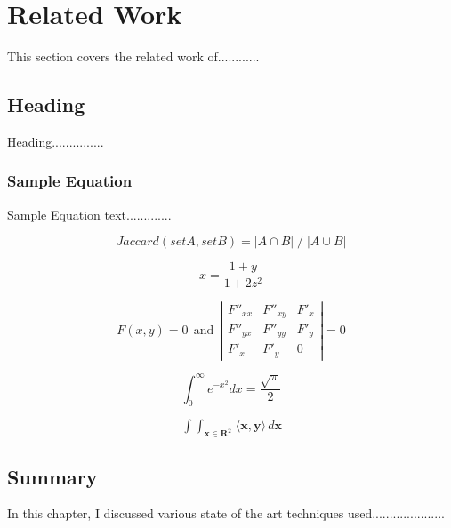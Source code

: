 \chapter{Related Work}
\label{cha:relatedwork}

This section covers the related work of............

\section{Heading}

Heading...............

\subsection{Sample Equation}

Sample Equation text.............

\[ Jaccard (set A, set B)  =  |A \cap B| \; / \; |A \cup B|  \]


\[ x=\frac{1+y}{1+2z^2} \]


\[ F(x,y)=0 ~~\mbox{and}~~
\left| \begin{array}{ccc}
F''_{xx} & F''_{xy} &  F'_x \\
F''_{yx} & F''_{yy} &  F'_y \\
F'_x     & F'_y     & 0 
\end{array}\right| = 0 \]


\[ \int_0^\infty e^{-x^2} dx=\frac{\sqrt{\pi}}{2} \]


$$
\mathop{\int \!\!\! \int}_{\mathbf{x} \in \mathbf{R}^2} 
\! \langle \mathbf{x},\mathbf{y}\rangle 
\,d\mathbf{x}
$$



\section{Summary}

In this chapter, I discussed various state of the art techniques used.....................